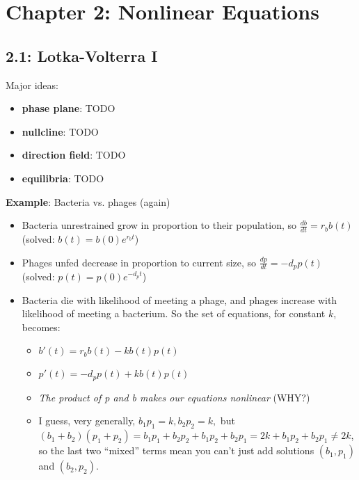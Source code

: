 \documentclass[11pt, oneside]{article}   	%
\begin{document}
\section{Chapter 2: Nonlinear Equations}
\subsection{2.1: Lotka-Volterra I}


Major ideas:
\begin{itemize}
\item \textbf{phase plane}: TODO
\item \textbf{nullcline}: TODO
\item \textbf{direction field}: TODO
\item \textbf{equilibria}: TODO
\end{itemize}
 
\textbf{Example}: Bacteria vs. phages (again)
\begin{itemize}
\item Bacteria unrestrained grow in proportion to their population, so $\frac{db}{dt} = r_b b(t)$ (solved: $b(t) = b(0)e^{r_b t}$)
\item Phages unfed decrease in proportion to current size, so $\frac{dp}{dt} = -d_p p(t)$  (solved: $p(t) = p(0)e^{-d_p t}$)
\item Bacteria die with likelihood of meeting a phage, and phages increase with likelihood of meeting a bacterium.  So the set of equations, for constant $k$, becomes:
\begin{itemize}
\item $b'(t) = r_b b(t) - kb(t)p(t)$
\item $p'(t) = -d_p p(t) + kb(t)p(t)$
\item \emph{The product of p and b makes our equations nonlinear} (WHY?)
\item I guess, very generally, $b_1p_1 = k, b_2p_2 = k,$ but $(b_1+b_2)(p_1+p_2) = b_1p_1 + b_2p_2 + b_1p_2+b_2p_1 = 2k + b_1p_2+b_2p_1 \neq 2k$, so the last two ``mixed'' terms mean you can't just add solutions $(b_1, p_1)$ and  $(b_2, p_2)$.
\end{itemize}
\end{itemize}
\end{document}
